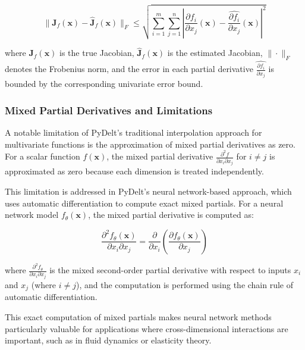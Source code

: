 \documentclass[10pt,journal,compsoc]{IEEEtran}
\begin{document}
\begin{equation}
    \|\mathbf{J}_f(\mathbf{x}) - \hat{\mathbf{J}}_f(\mathbf{x})\|_F \leq \sqrt{\sum_{i=1}^{m}\sum_{j=1}^{n} \left|\frac{\partial f_i}{\partial x_j}(\mathbf{x}) - \hat{\frac{\partial f_i}{\partial x_j}}(\mathbf{x})\right|^2}
\end{equation}

where $\mathbf{J}_f(\mathbf{x})$ is the true Jacobian, $\hat{\mathbf{J}}_f(\mathbf{x})$ is the estimated Jacobian, $\|\cdot\|_F$ denotes the Frobenius norm, and the error in each partial derivative $\hat{\frac{\partial f_i}{\partial x_j}}$ is bounded by the corresponding univariate error bound.

\subsubsection{Mixed Partial Derivatives and Limitations}

A notable limitation of PyDelt's traditional interpolation approach for multivariate functions is the approximation of mixed partial derivatives as zero. For a scalar function $f(\mathbf{x})$, the mixed partial derivative $\frac{\partial^2 f}{\partial x_i \partial x_j}$ for $i \neq j$ is approximated as zero because each dimension is treated independently.

This limitation is addressed in PyDelt's neural network-based approach, which uses automatic differentiation to compute exact mixed partials. For a neural network model $f_{\theta}(\mathbf{x})$, the mixed partial derivative is computed as:

\begin{equation}
    \frac{\partial^2 f_{\theta}(\mathbf{x})}{\partial x_i \partial x_j} = \frac{\partial}{\partial x_i}\left(\frac{\partial f_{\theta}(\mathbf{x})}{\partial x_j}\right)
\end{equation}

where $\frac{\partial^2 f_{\theta}}{\partial x_i \partial x_j}$ is the mixed second-order partial derivative with respect to inputs $x_i$ and $x_j$ (where $i \neq j$), and the computation is performed using the chain rule of automatic differentiation.

This exact computation of mixed partials makes neural network methods particularly valuable for applications where cross-dimensional interactions are important, such as in fluid dynamics or elasticity theory.
\end{document}
